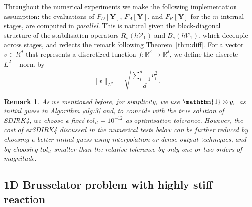 \documentclass[10pt,a4paper]{article}
\newtheorem{remark}[theorem]{Remark}
\newcommand{\R}{\mathbb{R}}
\renewcommand{\R}{\mathbb{R}}
\begin{document}

 
Throughout the numerical experiments we make the following implementation assumption: the evaluations of $F_D[\boldsymbol Y]$, $F_A[\boldsymbol Y]$, and $F_R[\boldsymbol Y]$ for the $m$ internal
stages, are computed in \emph{parallel}. This is natural given the
block-diagonal structure of the stabilisation operators $R_s(h\mathcal{V}_1)$ and
$B_s(h\mathcal{V}_1)$, which decouple across stages, and reflects the remark following
Theorem~\ref{thm:diff}. For a vector $v\in R^d$ that represents a discretized function $f:\R^d\rightarrow\R^d$, we define the discrete $L^2-$norm by
\[\|v\|_{L^2} = \sqrt{\frac{\sum_{i=1}^{d}v_i^2}d}.\]
\begin{remark}
    As we mentioned before, for simplicity, we use $\mathbbm{1} \otimes y_n$ as initial guess in Algorithm \ref{alg:3} and, to coincide with the true solution of SDIRK4, we choose a fixed $tol_{it} = 10^{-12}$ as optimisation tolerance. However, the cost of exSDIRK4 discussed in the numerical tests below can be further reduced by choosing a better initial guess using interpolation or dense output techniques, and by choosing $tol_{it}$ smaller than the relative tolerance by only one or two orders of magnitude.
\end{remark}
	\subsection{1D Brusselator problem with highly stiff reaction}
    
\end{document}
